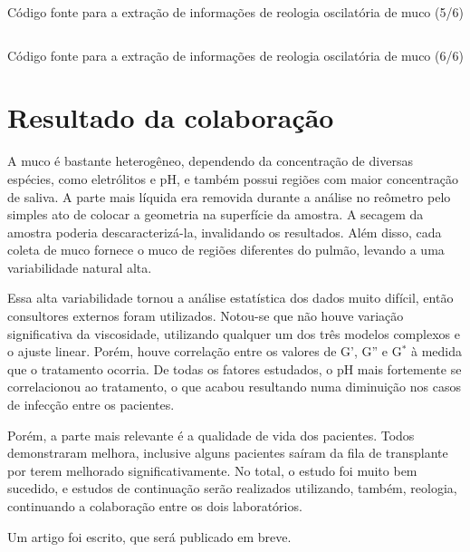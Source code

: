 		\begin{listing}[h]
			\inputminted{python}{./python/extracao_muco5.py}
			\caption{Código fonte para a extração de informações de reologia oscilatória de muco (5/6)}
			\label{lst:extracao_muco5}
		\end{listing}
		
		\begin{listing}[h]
			\inputminted{python}{./python/extracao_muco6.py}
			\caption{Código fonte para a extração de informações de reologia oscilatória de muco (6/6)} 
			\label{lst:extracao_muco6}
		\end{listing}
		
		\FloatBarrier
		
		\chapter{Resultado da colaboração} 
		
		A muco é bastante heterogêneo, dependendo da concentração de diversas espécies, como eletrólitos e pH, e também possui regiões com maior concentração de saliva. A parte mais líquida era removida durante a análise no reômetro pelo simples ato de colocar a geometria na superfície da amostra. A secagem da amostra poderia descaracterizá-la, invalidando os resultados. Além disso, cada coleta de muco fornece o muco de regiões diferentes do pulmão, levando a uma variabilidade natural alta.
		
		Essa alta variabilidade tornou a análise estatística dos dados muito difícil, então consultores externos foram utilizados. Notou-se que não houve variação significativa da viscosidade, utilizando qualquer um dos três modelos complexos e o ajuste linear.  Porém, houve correlação entre os valores de G', G'' e G\(^*\) à medida que o tratamento ocorria. De todas os fatores estudados, o pH mais fortemente se correlacionou ao tratamento, o que acabou resultando numa diminuição nos casos de infecção entre os pacientes.
		
		Porém, a parte mais relevante é a qualidade de vida dos pacientes. Todos demonstraram melhora, inclusive alguns pacientes saíram da fila de transplante por terem melhorado significativamente. No total, o estudo foi muito bem sucedido, e estudos de continuação serão realizados utilizando, também, reologia, continuando a colaboração entre os dois laboratórios.
		
		Um artigo foi escrito, que será publicado em breve. %
		
